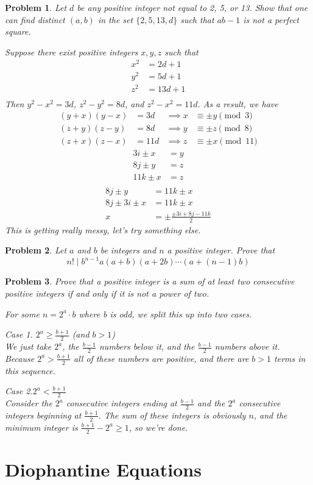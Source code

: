 \documentclass{scrartcl}
\newtheorem{a_problem}{Problem}
\begin{document}
\begin{a_problem}
Let $d$ be any positive integer not equal to 2, 5, or 13. Show that one can find distinct $(a,b)$ in the set $\{2,5,13,d\}$ such that $ab-1$ is not a perfect square.
	\begin{soln}
		Suppose there exist positive integers $x,y,z$ such that
		\begin{align*}
			x^2 &= 2d+1 \\
			y^2 &= 5d+1 \\
			z^2 &= 13d+1 \\
		\end{align*}
		Then $y^2-x^2 = 3d$, $z^2 - y^2 = 8d$, and $z^2 - x^2 = 11d$.
		As a result, we have
		\begin{align*}
			(y+x)(y-x) &= 3d  &\implies x &\equiv \pm y \pmod{3} \\
			(z+y)(z-y) &= 8d  &\implies y &\equiv \pm z \pmod{8} \\
			(z+x)(z-x) &= 11d &\implies z &\equiv \pm x \pmod{11}
		\end{align*}
		\begin{align*}
			3i \pm x &= y \\
			8j \pm y &= z \\
			11k \pm x &= z \\
		\end{align*}
		\begin{align*}
			8j \pm y &= 11k \pm x \\
			8j \pm 3i \pm x &= 11k \pm x \\
			x &= \pm\frac{\pm3i + 8j - 11k}{2}
		\end{align*}
		This is getting really messy, let's try something else.
			
	\end{soln}
\end{a_problem}

\begin{a_problem}
	Let $a$ and $b$ be integers and $n$ a positive integer. Prove that 
	\[n! \mid b^{n-1}a(a+b)(a+2b)\cdots(a+(n-1)b)\]
\end{a_problem}

\begin{a_problem}
	Prove that a positive integer is a sum of at least two consecutive positive integers if and only if it is not a power of two.
	\begin{soln}
		For some $n=2^a \cdot b$ where b is odd, we split this up into two cases.

		Case 1. $2^a \geq \frac{b+1}{2} $ (and $b > 1$) \\
		We just take $2^a$, the $\frac{b-1}{2}$ numbers below it, and the $\frac{b-1}{2}$ numbers above it. Because $2^a > \frac{b+1}{2}$ all of these numbers are positive, and there are $b > 1$ terms in this sequence.

		Case 2.$2^a < \frac{b+1}{2} $ \\
		Consider the $2^a$ consecutive integers ending at $\frac{b-1}{2}$ and the $2^a$ consecutive integers beginning at $\frac{b+1}{2}$. The sum of these integers is obviously $n$, and the minimum integer is $\frac{b+1}{2} - 2^a \geq 1$, so we're done.
	\end{soln}
\end{a_problem}

\section{Diophantine Equations}
\end{document}
